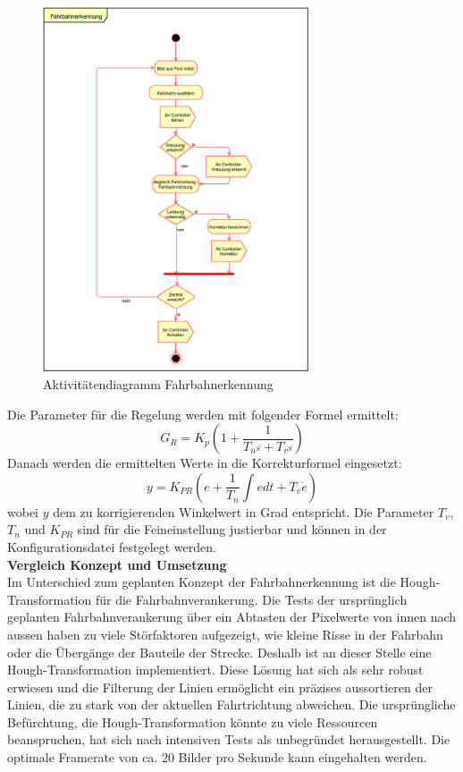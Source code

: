 \begin{figure}[H]%
\centering
\includegraphics[width=0.7\textwidth]{03_Loesungskonzept/pictures/Fahrbahnerkennung.png}
\caption{Aktivitätendiagramm Fahrbahnerkennung}
\label{fig:activityRoute}
\end{figure}
Die Parameter für die Regelung werden mit folgender Formel ermittelt:
\[
G_R = K_p\left(1 + \frac{1}{T_{n^S} + T_{v^S}}\right)
\]
Danach werden die ermittelten Werte in die Korrekturformel eingesetzt:
\[
y = K_{PR}\left(e + \frac{1}{T_n}\int{edt} + T_v\dot{e}\right)
\]
wobei $y$ dem zu korrigierenden Winkelwert in Grad entspricht. Die Parameter $T_v$, $T_n$ und $K_{PR}$ sind für die Feineinstellung justierbar und können in der Konfigurationsdatei festgelegt werden.\\[0.2cm]
\textbf{Vergleich Konzept und Umsetzung}\\[0.2cm]
Im Unterschied zum geplanten Konzept der Fahrbahnerkennung ist die Hough-Transformation für die Fahrbahnverankerung. Die Tests der ursprünglich geplanten Fahrbahnverankerung über ein Abtasten der Pixelwerte von innen nach aussen haben zu viele Störfaktoren aufgezeigt, wie kleine Risse in der Fahrbahn oder die Übergänge der Bauteile der Strecke. Deshalb ist an dieser Stelle eine Hough-Transformation implementiert. Diese Lösung hat sich als sehr robust erwiesen und die Filterung der Linien ermöglicht ein präzises aussortieren der Linien, die zu stark von der aktuellen Fahrtrichtung abweichen. Die ursprüngliche Befürchtung, die Hough-Transformation könnte zu viele Ressourcen beanspruchen, hat sich nach intensiven Tests als unbegründet herausgestellt. Die optimale Framerate von ca. 20 Bilder pro Sekunde kann eingehalten werden.\\

